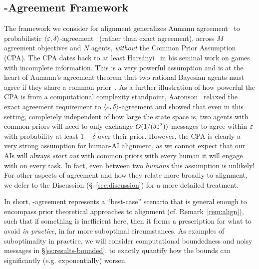 \subsection{\agree-Agreement Framework}
\label{ss:results-framework}
The framework we consider for alignment generalizes Aumann agreement~\citep{aumann1976agreeing} to probabilistic $\left \langle \varepsilon, \delta \right \rangle $-agreement~\citep{aaronson2005complexity} (rather than exact agreement), across $M$ agreement objectives and $N$ agents, \emph{without} the Common Prior Assumption (CPA).
The CPA dates back to at least Hars\'{a}nyi~\citep{harsanyi1967} in his seminal work on games with incomplete information.
This is a very powerful assumption and is at the heart of Aumann's agreement theorem that two rational Bayesian agents must agree if they share a common prior~\citep{aumann1976agreeing}.
As a further illustration of how powerful the CPA is from a computational complexity standpoint, Aaronson~\citep{aaronson2005complexity} relaxed the exact agreement requirement to $\left \langle \varepsilon, \delta \right \rangle $-agreement and showed that even in this setting, completely independent of how large the state space is, two agents with common priors will need to only exchange $O(1/(\delta\varepsilon^2))$ messages to agree within $\varepsilon$ with probability at least $1-\delta$ over their prior.
However, the CPA is clearly a very strong assumption for human-AI alignment, as we cannot expect that our AIs will always \emph{start out} with common priors with every human it will engage with on every task.
In fact, even between two \emph{humans} this assumption is unlikely!
For other aspects of agreement and how they relate more broadly to alignment, we defer to the Discussion (\S~\ref{sec:discussion}) for a more detailed treatment.

In short, \agree-agreement represents a ``best-case'' scenario that is general enough to encompass prior theoretical approaches to alignment (cf. Remark~\ref{rem:align}), such that if something is inefficient here, then it forms a prescription for what to avoid \emph{in practice}, in far more suboptimal circumstances.
As examples of suboptimality in practice, we will consider computational boundedness and noisy messages in \S\ref{ss:results-bounded}, to exactly quantify how the bounds can significantly (e.g. exponentially) worsen.

